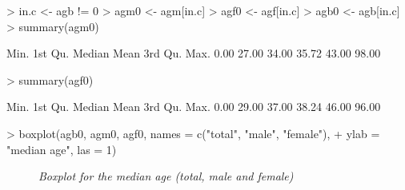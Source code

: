 \documentclass[12pt,a4paper]{article}
\begin{document}
\begin{Schunk}
\begin{Sinput}
> in.c <- agb != 0
> agm0 <- agm[in.c]
> agf0 <- agf[in.c]
> agb0 <- agb[in.c]
> summary(agm0)
\end{Sinput}
\begin{Soutput}
   Min. 1st Qu.  Median    Mean 3rd Qu.    Max. 
   0.00   27.00   34.00   35.72   43.00   98.00 
\end{Soutput}
\begin{Sinput}
> summary(agf0)
\end{Sinput}
\begin{Soutput}
   Min. 1st Qu.  Median    Mean 3rd Qu.    Max. 
   0.00   29.00   37.00   38.24   46.00   96.00 
\end{Soutput}
\begin{Sinput}
> boxplot(agb0, agm0, agf0, names = c("total", "male", "female"), 
+     ylab = "median age", las = 1)
\end{Sinput}
\end{Schunk}

\begin{figure}[h]
  \begin{center}
    \caption{\textsl{Boxplot for the median age (total, male and female)}}
    \label{boxplot}
  \end{center}
\end{figure}
\end{document}
